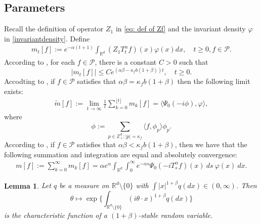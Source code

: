 \documentclass[12pt]{amsart}
\theoremstyle{plain}
\newtheorem{lem}[thm]{Lemma}
\theoremstyle{definition}
\numberwithin{equation}{section}
\begin{document}
\subsection{Parameters}
    Recall the definition of operator $Z_1$ in \eqref{eq: def of Zf} and the invariant density $\varphi$ in \eqref{invariantdensity}.
    Define
 \begin{align}
 \label{parameter_mk}
      m_t[f]
      :=e^{-\alpha (t+1)}\int_{\mathbb R^d} (Z_1T_t^{\alpha}f)(x)\varphi(x)dx,\quad t\geq 0, f\in \mathcal P.
 \end{align}
    According to \cite[Lemma 2.7]{MM}, for each $f\in\mathcal{P}$, there is a constant $C>0$ such that
\[
    |m_t[f]|
    \leq C e^{(\alpha\beta-\kappa_fb(1+\beta))t},
    \quad t\geq 0.
\]
    Accodting to \cite[Lemma 4.2]{MM}, if $f \in \mathcal{P}$ satisfies that $\alpha\beta=\kappa_f b(1+\beta)$ then the following limit exists:
\begin{align}
\label{para: critical case}
    \tilde{m}[f]:=\lim_{t\rightarrow \infty}\frac{1}{t}\sum_{k=0}^{\lfloor t \rfloor}m_k[f]=\langle\Psi_0(-i\phi),\varphi\rangle,
\end{align}
    where
\[
    \phi
    :=\sum_{p\in \mathbb Z_+^d:|p|=\kappa_f}\langle f, \phi_p\rangle\phi_p.
\]
    According to \cite[Lemma 5.1]{MM}, if $f\in \mathcal{P}$ satisfies that $\alpha\beta<\kappa_fb(1+\beta)$, then we have that the following summation and integration are equal and absolutely convergence:
\begin{align}
    m[f]
    :=\sum_{k=0}^\infty m_k[f]
    =\alpha e^{\alpha}\int_{\mathbb{R}^d}\int_0^{\infty} e^{-\alpha s}\Psi_0(-iT_{s}^{\alpha}f)(x)~ds~\varphi(x)~dx. \label{msmallcase}
\end{align}
\begin{lem}
\label{lem: charactreisticfunction}
    Let $q$ be a measure on $\mathbb R^d\setminus\{0\}$ with $\int |x|^{1+\beta} q(dx) \in (0,\infty)$.
    Then $$\theta \mapsto  \exp\Big\{\int_{\mathbb R^d\setminus\{0\}} (i\theta \cdot x)^{1+\beta} q(dx)\Big\}$$
    is the characteristic function of a $(1+\beta)$-stable random variable.
\end{lem}
\end{document}
